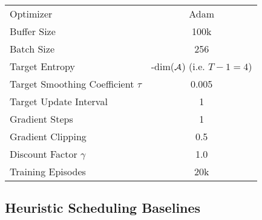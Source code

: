 \begin{table}[h]
\begin{subtable}{.45\textwidth}
{\begin{tabular}{l c }
				Optimizer      & Adam  \\
				Buffer Size & 100k \\
				Batch Size     & 256  \\
				Target Entropy & -dim(${\mathcal{A}}$) (i.e. $T-1=4$) \\
				Target Smoothing Coefficient $\tau$ & 0.005 \\
				Target Update Interval & 1 \\
				Gradient Steps & 1 \\ 
				Gradient Clipping & 0.5  \\
				Discount Factor $\gamma$ & 1.0  \\
				Training Episodes & 20k  \\
				\bottomrule
			\end{tabular}
		}
		\label{tab:sac_hyperparameters_new_datasets}
	\end{subtable} 
	\label{tab:sac_hyperparameters}
\end{table}


\clearpage 

\subsection*{Heuristic Scheduling Baselines}\label{paperD:app:heuristic_scheduling_baselines}

